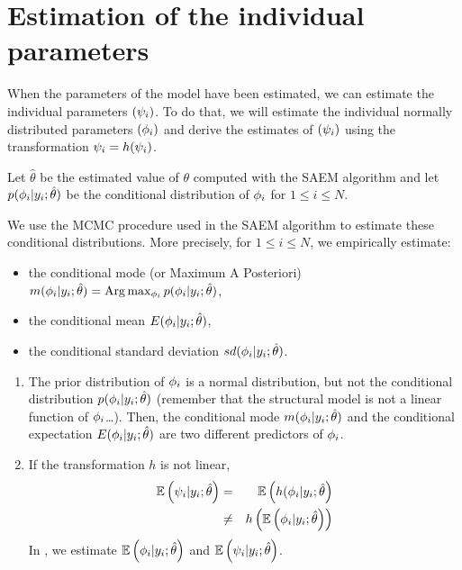 \section{Estimation of the individual parameters} \label{section_indivparam}

When the parameters of the model have been estimated, we can estimate the individual parameters $({\psi_i})$. To do that, we will estimate the individual normally distributed parameters $({{\phi}_i})$ and derive the estimates of $({\psi_i})$ using the transformation ${\psi_i}= h({\psi_i})$.

Let $\hat{\theta}$ be the estimated value of $\theta$ computed with the SAEM algorithm and let $p({{\phi}_i}|y_i;\hat{\theta})$ be the conditional distribution of ${{\phi}_i}$ for $1\leq i \leq N$.

We use the MCMC procedure used in the SAEM algorithm to estimate these conditional distributions. More precisely, for $1\leq i \leq N$, we empirically estimate:

\begin{itemize}
  \item the conditional mode (or Maximum A Posteriori)
  $ m({{\phi}_i}|y_i;\hat{\theta})={\rm Arg}\max_{{\phi}_i} p({{\phi}_i}|y_i;\hat{\theta})$,
  \item the conditional mean
  $ E({{\phi}_i}|y_i;\hat{\theta})$,
  \item the conditional standard deviation
 $ sd({{\phi}_i}|y_i;\hat{\theta})$.
 \end{itemize}

 \begin{enumerate}
  \item The prior distribution of ${{\phi}_i}$ is a normal distribution, but not the conditional distribution $p({{\phi}_i}|y_i;\hat{\theta})$ (remember that the structural model is not a linear function of ${{\phi}_i}$\ldots). Then, the conditional mode $m({{\phi}_i}|y_i;\hat{\theta})$ and the conditional expectation $ E({{\phi}_i}|y_i;\hat{\theta})$ are two different predictors of ${{\phi}_i}$.
  \item If the transformation $h$ is not linear,
      \begin{eqnarray*}
       \mathbb{E}\left({\psi_i}|y_i;\hat{\theta}\right) &=&  \mathbb{E}\left(h({{\phi}_i}|y_i;\hat{\theta}\right) \\
       &\neq& h\left(\mathbb{E}\left({{\phi}_i}|y_i;\hat{\theta}\right)  \right)
       \end{eqnarray*}
       In \monolix, we estimate $\mathbb{E}\left({{\phi}_i}|y_i;\hat{\theta}\right)$ and $\mathbb{E}\left({\psi_i}|y_i;\hat{\theta}\right)$.
\end{enumerate}

